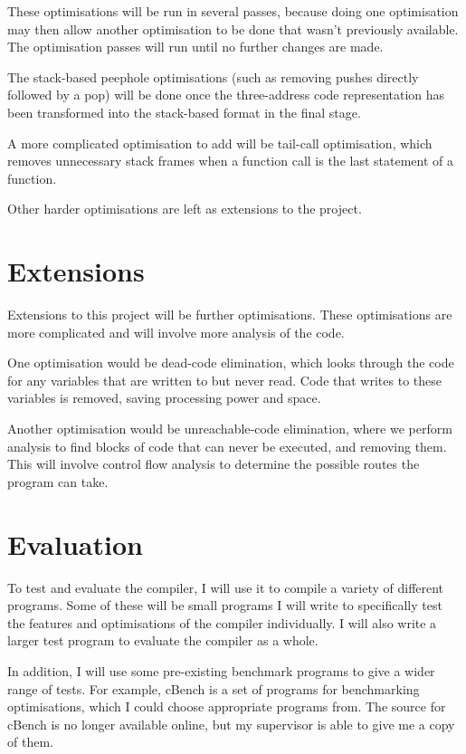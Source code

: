 \documentclass[12pt,a4paper]{article}
\begin{document}
These optimisations will be run in several passes, because doing one optimisation may then allow another optimisation to be done that wasn't previously available. The optimisation passes will run until no further changes are made.

The stack-based peephole optimisations (such as removing pushes directly followed by a pop) will be done once the three-address code representation has been transformed into the stack-based format in the final stage.

A more complicated optimisation to add will be tail-call optimisation, which removes unnecessary stack frames when a function call is the last statement of a function.

Other harder optimisations are left as extensions to the project.

\section*{Extensions}

Extensions to this project will be further optimisations. These optimisations are more complicated and will involve more analysis of the code.

One optimisation would be dead-code elimination, which looks through the code for any variables that are written to but never read. Code that writes to these variables is removed, saving processing power and space.

Another optimisation would be unreachable-code elimination, where we perform analysis to find blocks of code that can never be executed, and removing them. This will involve control flow analysis to determine the possible routes the program can take.


\section*{Evaluation}

To test and evaluate the compiler, I will use it to compile a variety of different programs. Some of these will be small programs I will write to specifically test the features and optimisations of the compiler individually. I will also write a larger test program to evaluate the compiler as a whole.

In addition, I will use some pre-existing benchmark programs to give a wider range of tests. For example, cBench is a set of programs for benchmarking optimisations, which I could choose appropriate programs from. The source for cBench is no longer available online, but my supervisor is able to give me a copy of them.
\end{document}
